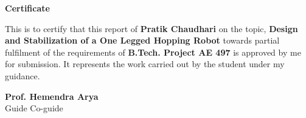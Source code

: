 \newpage
\vspace*{0.75in}
\label{pg:certi}
\begin{center}
{\bf \Huge Certificate}\\[0.5in]
\end{center}
{\normalsize This is to certify that this report of {\bf Pratik Chaudhari} on the topic, {\bf Design and
Stabilization of a One Legged Hopping Robot} towards partial fulfilment of the requirements of {\bf B.Tech.
Project AE 497}
is approved by me for submission. It represents the work carried out by the student under my guidance.}\\[1in]

\begin{center}
{\bf \large Prof. Hemendra Arya} \hspace{1.2in}{\bf \large Prof. Bhartendu Seth}\\[0.1in]
{\normalsize Guide \hspace{2.9in} Co-guide\\[0.1in]}
\end{center}

